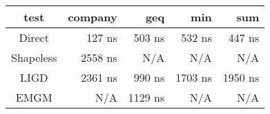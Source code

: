 \begin{tabular}{c|r|r|r|r}
\bf{test}  & \bf{company}    & \bf{geq}        & \bf{min}        & \bf{sum}       \\
\hline
Direct     &          127 ns &          503 ns &          532 ns &          447 ns\\
Shapeless  &         2558 ns &             N/A &             N/A &             N/A\\
LIGD       &         2361 ns &          990 ns &         1703 ns &         1950 ns\\
EMGM       &             N/A &         1129 ns &             N/A &             N/A\\
\end{tabular}
